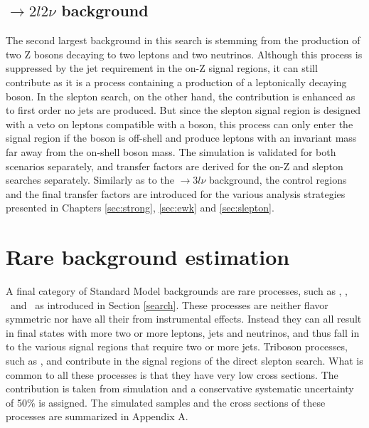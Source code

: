 \subsection*{\PZZ$\rightarrow 2l2\nu$ background}\label{ZZ}
\noindent
\justify
The second largest background in this search is stemming from the production of two Z bosons decaying to two leptons and two neutrinos. 
Although this process is suppressed by the jet requirement in the on-Z signal regions, it can still contribute as it is a process containing a production of a leptonically decaying \PZ boson. 
In the slepton search, on the other hand, the contribution is enhanced as to first order no jets are produced. 
But since the slepton signal region is designed with a veto on leptons compatible with a \PZ boson, this process can only enter the signal region if the \PZ boson is off-shell and produce leptons with an invariant mass far away from the on-shell \PZ boson mass. 
The simulation is validated for both scenarios separately, and transfer factors are derived for the on-Z and slepton searches separately. 
Similarly as to the \PWZ$\rightarrow3l\nu$ background, the control regions and the final transfer factors are introduced for the various analysis strategies presented in Chapters \ref{sec:strong}, \ref{sec:ewk} and \ref{sec:slepton}. 
\section{Rare background estimation}
\noindent\justify
A final category of Standard Model backgrounds are rare processes, such as  \ttW, \ttH, \tWZ\ and \tZq\ as introduced in Section \ref{search}. 
These processes are neither flavor symmetric nor have all their \ptmiss from instrumental effects. 
Instead they can all result in final states with more two or more leptons, jets and neutrinos, and thus fall in to the various signal regions that require two or more jets. 
Triboson processes, such as \PWWZ, \PWZZ and \PZZZ contribute in the signal regions of the direct slepton search. 
What is common to all these processes is that they have very low cross sections. 
The contribution is taken from simulation and a conservative systematic uncertainty of 50\% is assigned.
The simulated samples and the cross sections of these processes are summarized in Appendix A.  
